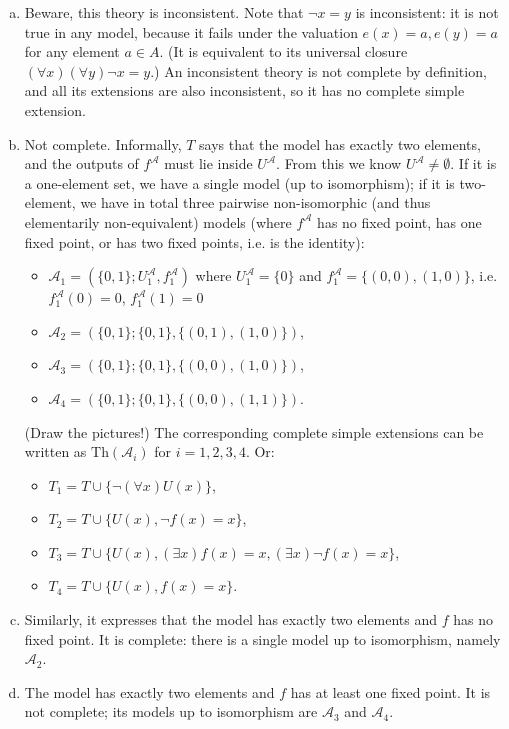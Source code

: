 \begin{problem}
    \begin{solution}
        \begin{enumerate}[(a)]
            \item Beware, this theory is inconsistent. Note that $\neg x=y$ is inconsistent: it is not true in any model, because it fails under the valuation $e(x)=a,e(y)=a$ for any element $a\in A$. (It is equivalent to its universal closure $(\forall x)(\forall y)\neg x=y$.) An inconsistent theory is not complete by definition, and all its extensions are also inconsistent, so it has no complete simple extension.
            \item Not complete. Informally, $T$ says that the model has exactly two elements, and the outputs of $f^\mathcal A$ must lie inside $U^\mathcal A$. From this we know $U^\mathcal A\neq\emptyset$. If it is a one-element set, we have a single model (up to isomorphism); if it is two-element, we have in total three pairwise non-isomorphic (and thus elementarily non-equivalent) models (where $f^\mathcal A$ has no fixed point, has one fixed point, or has two fixed points, i.e. is the identity):
            \begin{itemize}
                \item $\mathcal A_1=(\{0,1\};U^\mathcal A_1,f^\mathcal A_1)$ where $U^\mathcal A_1=\{0\}$ and $f^\mathcal A_1=\{(0,0),(1,0)\}$, i.e. $f^\mathcal A_1(0)=0$, $f^\mathcal A_1(1)=0$
                \item $\mathcal A_2=(\{0,1\};\{0,1\},\{(0,1),(1,0)\})$,
                \item $\mathcal A_3=(\{0,1\};\{0,1\},\{(0,0),(1,0)\})$,
                \item $\mathcal A_4=(\{0,1\};\{0,1\},\{(0,0),(1,1)\})$.
            \end{itemize} 
            (Draw the pictures!) The corresponding complete simple extensions can be written as $\mathrm{Th}(\mathcal A_i)$ for $i=1,2,3,4$. Or:
            \begin{itemize}
                \item $T_1=T\cup\{\neg (\forall x) U(x)\}$,
                \item $T_2=T\cup\{U(x),\neg f(x)=x\}$,
                \item $T_3=T\cup\{U(x),(\exists x)f(x)=x,(\exists x)\neg f(x)=x\}$,
                \item $T_4=T\cup\{U(x),f(x)=x\}$.
            \end{itemize}
            \item Similarly, it expresses that the model has exactly two elements and $f$ has no fixed point. It is complete: there is a single model up to isomorphism, namely $\mathcal A_2$.
            \item The model has exactly two elements and $f$ has at least one fixed point. It is not complete; its models up to isomorphism are $\mathcal A_3$ and $\mathcal A_4$.
            

        \end{enumerate}
                    
    \end{solution}

\end{problem}

